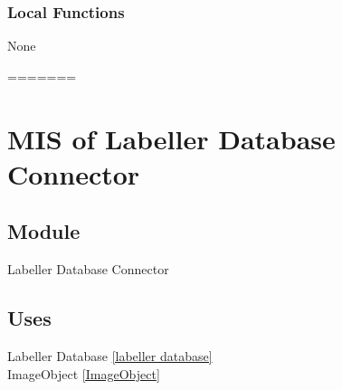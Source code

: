 \documentclass[12pt, titlepage]{article}
\begin{document}
  
  
  \subsubsection{Local Functions}

  None
  
=======

\newpage


\section{MIS of Labeller Database Connector}\label{labeller database connector}
  
  
  
  \subsection{Module}
  
  Labeller Database Connector

  
  \subsection{Uses}
  
  Labeller Database \ref{labeller database}\\
  ImageObject \ref{ImageObject}\\ 
\end{document}
